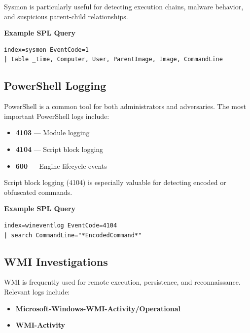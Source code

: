 Sysmon is particularly useful for detecting execution chains, malware behavior, and suspicious parent-child relationships.

\textbf{Example SPL Query}

\begin{lstlisting}
index=sysmon EventCode=1
| table _time, Computer, User, ParentImage, Image, CommandLine
\end{lstlisting}


\subsection*{PowerShell Logging}

PowerShell is a common tool for both administrators and adversaries. 
The most important PowerShell logs include:

\begin{itemize}
    \item \textbf{4103} — Module logging
    \item \textbf{4104} — Script block logging
    \item \textbf{600} — Engine lifecycle events
\end{itemize}

Script block logging (4104) is especially valuable for detecting encoded or obfuscated commands.

\textbf{Example SPL Query}

\begin{lstlisting}
index=wineventlog EventCode=4104
| search CommandLine="*EncodedCommand*"
\end{lstlisting}


\subsection*{WMI Investigations}

WMI is frequently used for remote execution, persistence, and reconnaissance. 
Relevant logs include:

\begin{itemize}
    \item \textbf{Microsoft-Windows-WMI-Activity/Operational}
    \item \textbf{WMI-Activity}
\end{itemize}

